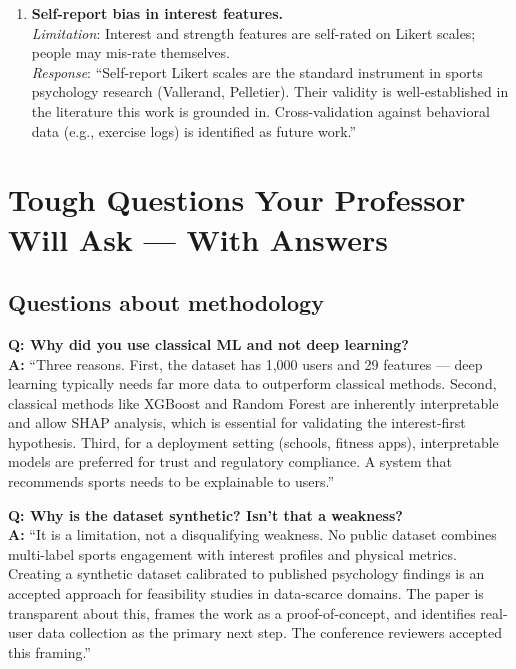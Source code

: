 \documentclass[12pt,a4paper]{article}
\begin{document}
\begin{enumerate}[leftmargin=*, label=\textbf{L\arabic*.}]
\item \textbf{Self-report bias in interest features.}\\
\textit{Limitation}: Interest and strength features are self-rated on Likert
scales; people may mis-rate themselves.\\
\textit{Response}: ``Self-report Likert scales are the standard instrument in
sports psychology research (Vallerand, Pelletier). Their validity is
well-established in the literature this work is grounded in. Cross-validation
against behavioral data (e.g., exercise logs) is identified as future work.''

\end{enumerate}

\section{Tough Questions Your Professor Will Ask --- With Answers}

\subsection{Questions about methodology}

\begin{qabox}
\textbf{Q: Why did you use classical ML and not deep learning?}\\[4pt]
\textbf{A:} ``Three reasons. First, the dataset has 1,000 users and 29
features --- deep learning typically needs far more data to outperform
classical methods. Second, classical methods like XGBoost and Random Forest
are inherently interpretable and allow SHAP analysis, which is essential for
validating the interest-first hypothesis. Third, for a deployment setting
(schools, fitness apps), interpretable models are preferred for trust and
regulatory compliance. A system that recommends sports needs to be explainable
to users.''
\end{qabox}

\begin{qabox}
\textbf{Q: Why is the dataset synthetic? Isn't that a weakness?}\\[4pt]
\textbf{A:} ``It is a limitation, not a disqualifying weakness. No public
dataset combines multi-label sports engagement with interest profiles and
physical metrics. Creating a synthetic dataset calibrated to published
psychology findings is an accepted approach for feasibility studies in
data-scarce domains. The paper is transparent about this, frames the work
as a proof-of-concept, and identifies real-user data collection as the
primary next step. The conference reviewers accepted this framing.''
\end{qabox}
\end{document}
